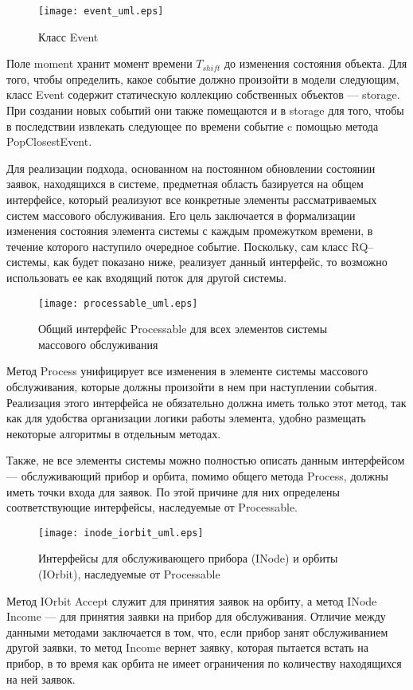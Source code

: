 \begin{figure}[H]
	\centering
	\texttt{[image: event\_uml.eps]}
	\caption{Класс Event}
	\label{event_uml}
\end{figure}
Поле moment хранит момент времени $T_{shift}$ до изменения состояния объекта. Для того, чтобы определить, какое событие должно произойти в модели следующим, класс Event содержит статическую коллекцию собственных объектов --- storage. При создании новых событий они также помещаются и в storage для того, чтобы в последствии извлекать следующее по времени событие c помощью метода PopClosestEvent.

Для реализации подхода, основанном на постоянном обновлении состоянии заявок, находящихся в системе, предметная область базируется на общем интерфейсе, который реализуют все конкретные элементы рассматриваемых систем массового обслуживания. Его цель заключается в формализации изменения состояния элемента системы с каждым промежутком времени, в течение которого наступило очередное событие. Поскольку, сам класс RQ--системы, как будет показано ниже, реализует данный интерфейс, то возможно использовать ее как входящий поток для другой системы.
\begin{figure}[H]
	\centering
	\texttt{[image: processable\_uml.eps]}
	\caption{Общий интерфейс Processable для всех элементов системы массового обслуживания}
	\label{processable_uml}
\end{figure}
Метод Process унифицирует все изменения в элементе системы массового обслуживания, которые должны произойти в нем при наступлении события. Реализация этого интерфейса не обязательно должна иметь только этот метод, так как для удобства организации логики работы элемента, удобно размещать некоторые алгоритмы в отдельным методах.

Также, не все элементы системы можно полностью описать данным интерфейсом --- обслуживающий прибор и орбита, помимо общего метода Process, должны иметь точки входа для заявок. По этой причине для них определены соответствующие интерфейсы, наследуемые от Processable.
\begin{figure}[H]
	\centering
	\texttt{[image: inode\_iorbit\_uml.eps]}
	\caption{Интерфейсы для обслуживающего прибора (INode) и орбиты (IOrbit), наследуемые от Processable}
	\label{inode_iorbit_uml}
\end{figure}
Метод IOrbit Accept служит для принятия заявок на орбиту, а метод INode Income --- для принятия заявки на прибор для обслуживания. Отличие между данными методами заключается в том, что, если прибор занят обслуживанием другой заявки, то метод Income вернет заявку, которая пытается встать на прибор, в то время как орбита не имеет ограничения по количеству находящихся на ней заявок.

